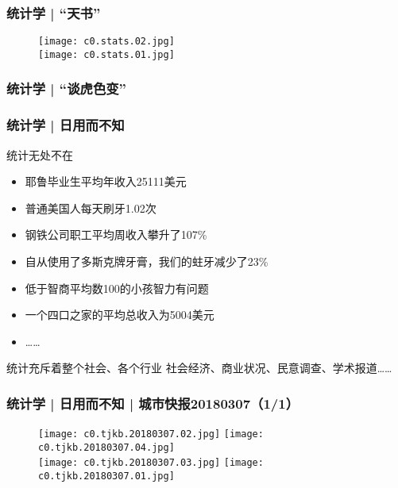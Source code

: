 \begin{frame}
  \frametitle{统计学 | “天书”}
  \begin{figure}
    \centering
    \texttt{[image: c0.stats.02.jpg]}\\
    \texttt{[image: c0.stats.01.jpg]}
  \end{figure}
\end{frame}

\begin{frame}
  \frametitle{统计学 | “谈虎色变”}
  \begin{figure}
    \centering
  \end{figure}
\end{frame}

\begin{frame}[fragile]
  \frametitle{统计学 | 日用而不知}
  \begin{block}{统计无处不在}
    \begin{itemize}
      \item 耶鲁毕业生平均年收入25111美元 
      \item 普通美国人每天刷牙1.02次
      \item 钢铁公司职工平均周收入攀升了107\%
      \item 自从使用了多斯克牌牙膏，我们的蛀牙减少了23\%
      \item 低于智商平均数100的小孩智力有问题
      \item 一个四口之家的平均总收入为5004美元
      \item ……
    \end{itemize}
  \end{block}
  \pause
  \begin{block}{统计充斥着整个社会、各个行业}
    社会经济、商业状况、民意调查、学术报道……
  \end{block}
\end{frame}

\begin{frame}
  \frametitle{统计学 | 日用而不知 | 城市快报20180307（1/1）}
  \begin{figure}
    \centering
    \texttt{[image: c0.tjkb.20180307.02.jpg]}\quad
    \texttt{[image: c0.tjkb.20180307.04.jpg]}\\
    \texttt{[image: c0.tjkb.20180307.03.jpg]}\quad
    \texttt{[image: c0.tjkb.20180307.01.jpg]}\\
  \end{figure}
\end{frame}

